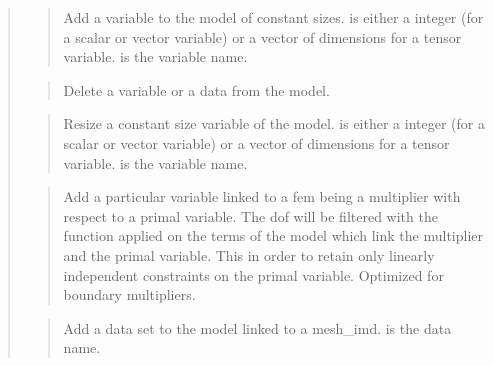 \documentclass[a4paper,11pt,english]{sphinxmanual}
\begin{document}
\begin{quote}
\begin{quote}
Add a variable to the model of constant sizes.  is either a
integer (for a scalar or vector variable) or a vector of dimensions
for a tensor variable.  is the variable name.
\end{quote}

\begin{quote}

Delete a variable or a data from the model.
\end{quote}

\begin{quote}

Resize a  constant size variable of the model.   is either a
integer (for a scalar or vector variable) or a vector of dimensions
for a tensor variable.  is the variable name.
\end{quote}

\begin{quote}

Add a particular variable linked to a fem being a multiplier with
respect to a primal variable. The dof will be filtered with the
 function applied on the terms of the model
which link the multiplier and the primal variable. This in order to
retain only linearly independent constraints on the primal variable.
Optimized for boundary multipliers.
\end{quote}

\begin{quote}

Add a data set to the model linked to a mesh\_imd.  is the data
name.
\end{quote}

\begin{quote}


\end{quote}
\end{quote}
\end{document}

